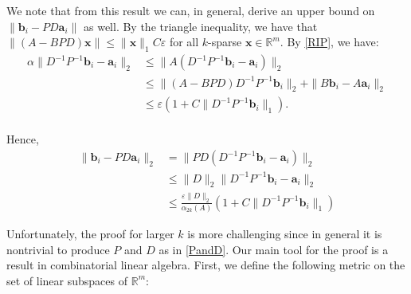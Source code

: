 \documentclass[journal, onecolumn]{IEEEtran}
\begin{document}
We note that from this result we can, in general, derive an upper bound on $\|\mathbf{b}_i - PD\mathbf{a}_i\|$ as well. By the triangle inequality, we have that $\|(A-BPD)\mathbf{x}\| \leq \|\mathbf{x}\|_1C\varepsilon$ for all $k$-sparse $\mathbf{x} \in \mathbb{R}^m$. By \eqref{RIP}, we have:
\begin{align*}
\alpha \|D^{-1}P^{-1}\mathbf{b}_i - \mathbf{a}_i\|_2 
&\leq \|A(D^{-1}P^{-1}\mathbf{b}_i - \mathbf{a}_i)\|_2 \\
&\leq \|(A - BPD)D^{-1}P^{-1}\mathbf{b}_i\|_2 + \|B\mathbf{b}_i - A\mathbf{a}_i\|_2 \\
&\leq \varepsilon (1 + C\|D^{-1}P^{-1}\mathbf{b}_i\|_1). \\
\end{align*}

Hence, 
\begin{align*}
\|\mathbf{b}_i - PD\mathbf{a}_i\|_2 &=  \|PD(D^{-1}P^{-1}\mathbf{b}_i - \mathbf{a}_i)\|_2 \\
&\leq \|D\|_2 \|D^{-1}P^{-1}\mathbf{b}_i - \mathbf{a}_i\|_2 \\
&\leq \frac{\varepsilon \|D\|_2}{\alpha_{2k}(A)}\left( 1 + C\|D^{-1}P^{-1}\mathbf{b}_i\|_1 \right)
\end{align*}


Unfortunately, the proof for larger $k$ is more challenging since in general it is nontrivial to produce $P$ and $D$ as in \eqref{PandD}. Our main tool for the proof is a result in combinatorial linear algebra. First, we define the following metric on the set of linear subspaces of $\mathbb{R}^m$:
\end{document}
